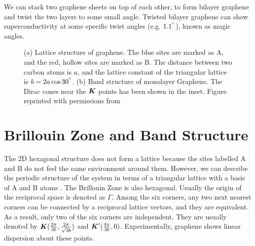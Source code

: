 \documentclass{report}
\renewcommand\vec[1]{\ensuremath\boldsymbol{#1}} %
\begin{document}
We can stack two graphene sheets on top of each other, to form bilayer graphene and twist the two layers to some small angle. Twisted bilayer graphene can show superconductivity \cite{Cao2018TBLSuperconductivity} at some specific twist angles (e.g. $1.1^{\degree}$), known as magic angles.

\begin{figure}[h!]
	\centering
	\caption{(a) Lattice structure of graphene. The blue sites are marked as A, and the red, hollow sites are marked as B. The distance between two carbon atoms is $a$, and the lattice constant of the triangular lattice is $b = 2 a \cos{30^{\degree}}$. (b) Band structure of monolayer Graphene. The Dirac cones near the $\vec{K}$ points has been shown in the inset. Figure reprinted with permissions from \cite{TheElPropGraphene}}
	\label{fig:GrapheneBandStructure}
\end{figure}

\section{Brillouin Zone and Band Structure}
The 2D hexagonal structure does not form a lattice because the sites labelled A and B do not feel the same environment around them. However, we can describe the periodic structure of the system in terms of a triangular lattice with a basis of A and B atoms \cite{book:SimonSolidState}. The Brillouin Zone is also hexagonal. Usually the origin of the reciprocal space is denoted as $\Gamma$. Among the six corners, any two next nearest corners can be connected by a reciprocal lattice vectors, and they are equivalent. As a result, only two of the six corners are independent. They are usually denoted by $\vec{K} (\frac{2\pi}{3b},\frac{2\pi}{\sqrt{3} b})$ and $\vec{K}'(\frac{4\pi}{3b},0)$. Experimentally, graphene shows linear dispersion about these points.
\end{document}
